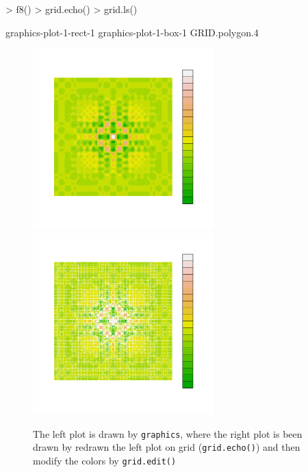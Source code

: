 \documentclass[paper=a4, fontsize=11pt]{report}
\begin{document}
\begin{Schunk}
\begin{Sinput}
> f8()
> grid.echo()
> grid.ls()
\end{Sinput}
\begin{Soutput}
graphics-plot-1-rect-1
graphics-plot-1-box-1
GRID.polygon.4
\end{Soutput}
\end{Schunk}



\begin{figure}[h]
\begin{center}
  \includegraphics[height = 7cm, width = 7cm]{figure/Chapter6_example_2_2.pdf}
  \includegraphics[height = 7cm, width = 7cm]{figure/Chapter6_example_2_3.pdf}
  \caption{The left plot is drawn by \texttt{graphics}, where the right plot is been drawn by redrawn the left plot on grid (\texttt{grid.echo()}) and then modify the colors by \texttt{grid.edit()}}
  	\label{Example_6.1}
\end{center}
\end{figure}
\end{document}
